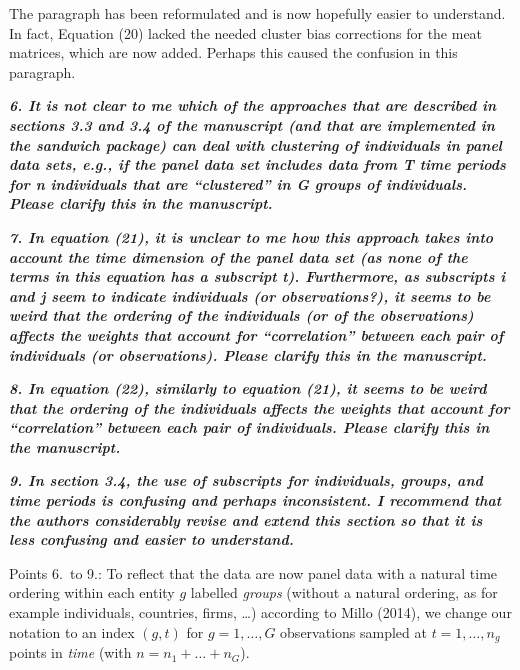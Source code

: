 \documentclass[10pt,a4paper]{article}
\begin{document}
\medskip

The paragraph has been reformulated and is now hopefully easier to understand. In fact, Equation (20) lacked the needed cluster bias corrections for the meat matrices, which are now added. Perhaps this caused the confusion in this paragraph.

\medskip

\textbf{\textit{6. It is not clear to me which of the approaches that are described in sections 3.3 and 3.4
of the manuscript (and that are implemented in the sandwich package) can deal with clustering of individuals in panel data sets, e.g., if the panel data set includes data from T time periods for n individuals that are ``clustered'' in G groups of individuals. Please clarify this in the manuscript.}}

\medskip

\textbf{\textit{7. In equation (21), it is unclear to me how this approach takes into account the time
dimension of the panel data set (as none of the terms in this equation has a subscript t).
Furthermore, as subscripts i and j seem to indicate individuals (or observations?), it
seems to be weird that the ordering of the individuals (or of the observations) affects the
weights that account for ``correlation'' between each pair of individuals (or observations).
Please clarify this in the manuscript.}}

\medskip

\textbf{\textit{8. In equation (22), similarly to equation (21), it seems to be weird that the ordering of
the individuals affects the weights that account for ``correlation'' between each pair of
individuals. Please clarify this in the manuscript.}}

\medskip

\textbf{\textit{9. In section 3.4, the use of subscripts for individuals, groups, and time periods is confusing
and perhaps inconsistent. I recommend that the authors considerably revise and extend
this section so that it is less confusing and easier to understand.}}

\medskip

 Points 6.~to 9.: To reflect that the data are now panel data with a natural time ordering within each entity $g$ labelled \emph{groups} (without a natural ordering, as for example individuals, countries, firms, \ldots) according to Millo (2014), we change our notation
to an index $(g, t)$ for $g = 1, \dots, G$ observations sampled at $t = 1, \ldots, n_g$ points in \emph{time} (with $n = n_1 + \dots + n_G$).
\end{document}
